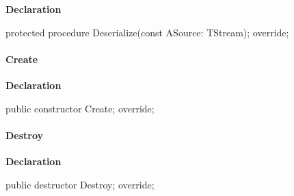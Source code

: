 \documentclass{report}
\newif\ifpdf
\begin{document}
\label{PasDoc_Items.TBaseItem-Deserialize}
\begin{list}{}{
\setlength{\itemindent}{0cm}
\setlength{\listparindent}{0cm}
\setlength{\leftmargin}{\evensidemargin}
\addtolength{\leftmargin}{\tmplength}
\settowidth{\labelsep}{X}
\addtolength{\leftmargin}{\labelsep}
\setlength{\labelwidth}{\tmplength}
}
\item[\textbf{Declaration}\hfill]
\ifpdf
\begin{flushleft}
\fi
\begin{ttfamily}
protected procedure Deserialize(const ASource: TStream); override;\end{ttfamily}

\ifpdf
\end{flushleft}
\fi

\end{list}
\paragraph*{Create}\hspace*{\fill}

\label{PasDoc_Items.TBaseItem-Create}
\begin{list}{}{
\setlength{\itemindent}{0cm}
\setlength{\listparindent}{0cm}
\setlength{\leftmargin}{\evensidemargin}
\addtolength{\leftmargin}{\tmplength}
\settowidth{\labelsep}{X}
\addtolength{\leftmargin}{\labelsep}
\setlength{\labelwidth}{\tmplength}
}
\item[\textbf{Declaration}\hfill]
\ifpdf
\begin{flushleft}
\fi
\begin{ttfamily}
public constructor Create; override;\end{ttfamily}

\ifpdf
\end{flushleft}
\fi

\end{list}
\paragraph*{Destroy}\hspace*{\fill}

\label{PasDoc_Items.TBaseItem-Destroy}
\begin{list}{}{
\setlength{\itemindent}{0cm}
\setlength{\listparindent}{0cm}
\setlength{\leftmargin}{\evensidemargin}
\addtolength{\leftmargin}{\tmplength}
\settowidth{\labelsep}{X}
\addtolength{\leftmargin}{\labelsep}
\setlength{\labelwidth}{\tmplength}
}
\item[\textbf{Declaration}\hfill]
\ifpdf
\begin{flushleft}
\fi
\begin{ttfamily}
public destructor Destroy; override;\end{ttfamily}

\ifpdf
\end{flushleft}
\fi

\end{list}
\end{document}
